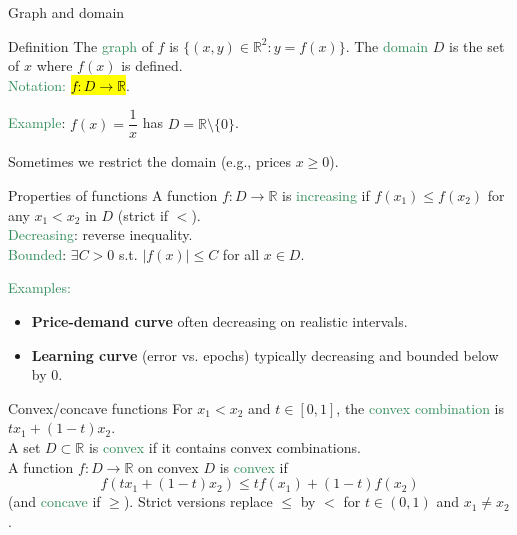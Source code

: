 \documentclass[11pt,aspectratio=169]{beamer}
\begin{document}
\begin{frame}{Graph and domain}

\begin{block}{Definition}
The \textcolor{SeaGreen}{graph} of $f$ is $\{(x,y)\in\mathbb{R}^2: y=f(x)\}$.
\vskip 6pt
The \textcolor{SeaGreen}{domain} $D$ is the set of $x$ where $f(x)$ is defined. \\[4pt]
\textcolor{SeaGreen}{Notation:} \hl{$f:D \rightarrow \mathbb{R}$}.	
\end{block}
\bigskip

\textcolor{SeaGreen}{Example}: $f(x)=\dfrac{1}{x}$ has $D=\mathbb{R}\setminus\{0\}$. 
\smallskip

Sometimes we restrict the domain (e.g., prices $x\ge 0$).
\end{frame}


\begin{frame}{Properties of functions}
A function $f:D \rightarrow \mathbb{R}$ is \textcolor{SeaGreen}{increasing} if 
$f(x_1)\le f(x_2)$ for any $x_1<x_2$ in $D$ (strict if $<$).\\[6pt]
\textcolor{SeaGreen}{Decreasing}: reverse inequality.\\[6pt]
\textcolor{SeaGreen}{Bounded}: $\exists C>0$ s.t. $|f(x)|\le C$ for all $x\in D$. 
\bigskip

\textcolor{SeaGreen}{Examples:}
\begin{itemize}
\item \textbf{Price-demand curve} often decreasing on realistic intervals.
\item \textbf{Learning curve} (error vs. epochs) typically decreasing and bounded below by $0$.
\end{itemize}
\end{frame}



\begin{frame}{Convex/concave functions}
For $x_1<x_2$ and $t\in[0,1]$, the \textcolor{SeaGreen}{convex combination} is $tx_1+(1-t)x_2$.\\[4pt]
A set $D\subset\mathbb{R}$ is \textcolor{SeaGreen}{convex} if it contains convex combinations.\\[6pt]
A function $f:D\to\mathbb{R}$ on convex $D$ is \textcolor{SeaGreen}{convex} if
\[
f(tx_1+(1-t)x_2)\le tf(x_1)+(1-t)f(x_2)
\]
(and \textcolor{SeaGreen}{concave} if $\ge$). Strict versions replace $\le$ by $<$ for $t\in(0,1)$ and $x_1\ne x_2$.
\end{frame}
\end{document}
